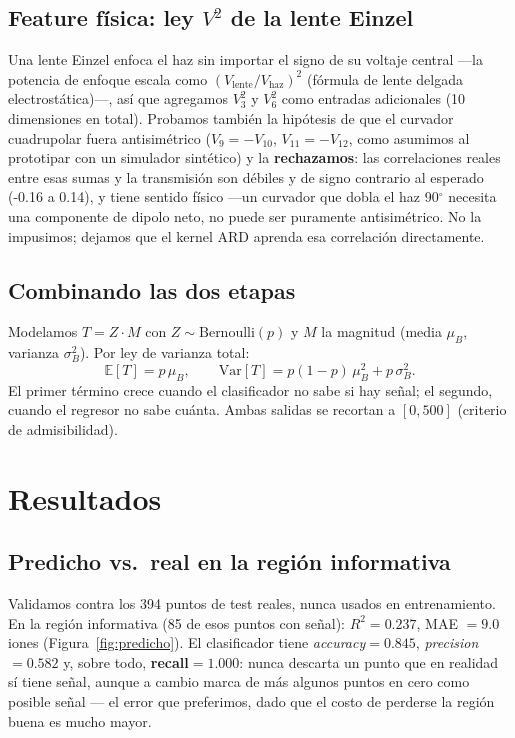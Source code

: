 \documentclass[11pt]{article}
\begin{document}
\subsection{Feature física: ley $V^2$ de la lente Einzel}

Una lente Einzel enfoca el haz sin importar el signo de su voltaje central —la potencia
de enfoque escala como $(V_{\text{lente}}/V_{\text{haz}})^2$ (fórmula de lente delgada
electrostática)—, así que agregamos $V_3^2$ y $V_6^2$ como entradas adicionales (10
dimensiones en total). Probamos también la hipótesis de que el curvador cuadrupolar
fuera antisimétrico ($V_9=-V_{10}$, $V_{11}=-V_{12}$, como asumimos al prototipar con un
simulador sintético) y la \textbf{rechazamos}: las correlaciones reales entre esas sumas
y la transmisión son débiles y de signo contrario al esperado (-0.16 a 0.14), y tiene
sentido físico —un curvador que dobla el haz 90$^\circ$ necesita una componente de dipolo
neto, no puede ser puramente antisimétrico. No la impusimos; dejamos que el kernel ARD
aprenda esa correlación directamente.

\subsection{Combinando las dos etapas}

Modelamos $T = Z\cdot M$ con $Z\sim\text{Bernoulli}(p)$ y $M$ la magnitud (media
$\mu_B$, varianza $\sigma_B^2$). Por ley de varianza total:
\begin{equation}
  \mathbb{E}[T] = p\,\mu_B, \qquad
  \text{Var}[T] = p(1-p)\,\mu_B^2 + p\,\sigma_B^2 .
\end{equation}
El primer término crece cuando el clasificador no sabe si hay señal; el segundo, cuando
el regresor no sabe cuánta. Ambas salidas se recortan a $[0,500]$ (criterio de
admisibilidad).

\section{Resultados}

\subsection{Predicho vs.\ real en la región informativa}

Validamos contra los 394 puntos de test reales, nunca usados en entrenamiento. En la
región informativa (85 de esos puntos con señal): $R^2=0.237$, MAE $=9.0$ iones
(Figura~\ref{fig:predicho}). El clasificador tiene \emph{accuracy}$=0.845$,
\emph{precision}$=0.582$ y, sobre todo, \textbf{recall}$=1.000$: nunca descarta un punto
que en realidad sí tiene señal, aunque a cambio marca de más algunos puntos en cero como
posible señal — el error que preferimos, dado que el costo de perderse la región buena es
mucho mayor.
\end{document}

